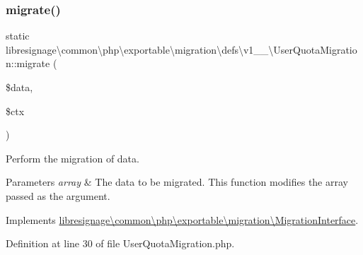 \subsubsection{\texorpdfstring{migrate()}{migrate()}}
{\footnotesize\ttfamily static libresignage\textbackslash{}common\textbackslash{}php\textbackslash{}exportable\textbackslash{}migration\textbackslash{}defs\textbackslash{}v1\+\_\+\_\textbackslash{}\+User\+Quota\+Migration\+::migrate (\begin{DoxyParamCaption}\item[{array \&}]{\$data,  }\item[{\hyperlink{classlibresignage_1_1common_1_1php_1_1exportable_1_1ExportableDataContext}{Exportable\+Data\+Context}}]{\$ctx }\end{DoxyParamCaption})\hspace{0.3cm}{\ttfamily [static]}}

Perform the migration of data.


\begin{DoxyParams}{Parameters}
{\em array} & The data to be migrated. This function modifies the array passed as the argument. \\
\hline
\end{DoxyParams}


Implements \hyperlink{interfacelibresignage_1_1common_1_1php_1_1exportable_1_1migration_1_1MigrationInterface_a8275bfe14f59f19bb3b33b239fd48c5d}{libresignage\textbackslash{}common\textbackslash{}php\textbackslash{}exportable\textbackslash{}migration\textbackslash{}\+Migration\+Interface}.



Definition at line 30 of file User\+Quota\+Migration.\+php.

\mbox{\label{classlibresignage_1_1common_1_1php_1_1exportable_1_1migration_1_1defs_1_1v1__1__0_1_1UserQuotaMigration_a52af40bd6e9b89a76a3095ea9a24d22e}} 
